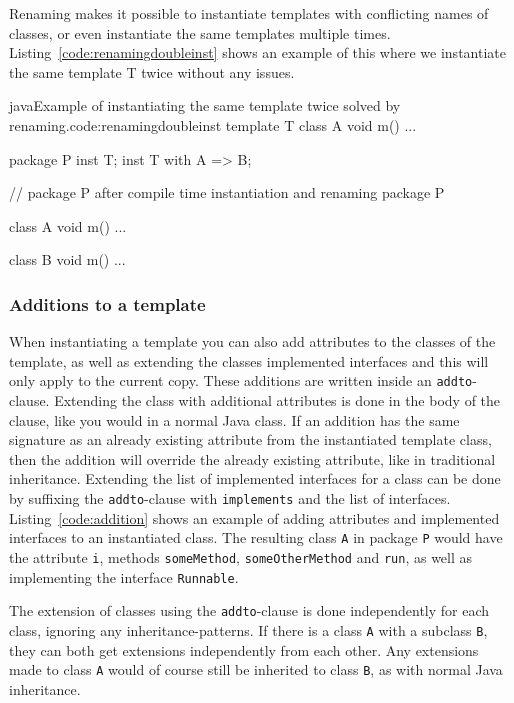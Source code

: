 Renaming makes it possible to instantiate templates with conflicting names of classes, or even instantiate the same templates multiple times.
Listing~\vref{code:renamingdoubleinst} shows an example of this where we instantiate the same template T twice without any issues.

\begin{code}{java}{Example of instantiating the same template twice solved by renaming.}{code:renamingdoubleinst}
template T {
    class A {
        void m() { ... }
    }
}

package P {
    inst T;
    inst T with A => B;
}

// package P after compile time instantiation and renaming
package P {
    class A {
        void m() { ... }
    }

    class B {
        void m() { ... }
    }
}
\end{code}

\subsubsection{Additions to a template}\label{sec:additions}

When instantiating a template you can also add attributes to the classes of the template, as well as extending the classes implemented interfaces and this will only apply to the current copy.
These additions are written inside an \verb|addto|-clause. Extending the class with additional attributes is done in the body of the clause, like you would in a normal Java class.
If an addition has the same signature as an already existing attribute from the instantiated template class, then the addition will override the already existing attribute, like in traditional inheritance.
Extending the list of implemented interfaces for a class can be done by suffixing the \verb|addto|-clause with \verb|implements| and the list of interfaces.
Listing~\vref{code:addition} shows an example of adding attributes and implemented interfaces to an instantiated class.
The resulting class \verb|A| in package \verb|P| would have the attribute \verb|i|, methods \verb|someMethod|, \verb|someOtherMethod| and \verb|run|, as well as implementing the interface \verb|Runnable|.

The extension of classes using the \verb|addto|-clause is done independently for each class, ignoring any inheritance-patterns. If there is a class \verb|A| with a subclass \verb|B|, they can both get extensions independently from each other. Any extensions made to class \verb|A| would of course still be inherited to class \verb|B|, as with normal Java inheritance.


